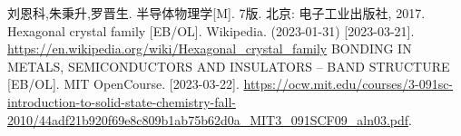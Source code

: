 \begin{thebibliography}{99}%
     刘恩科,朱秉升,罗晋生. 半导体物理学[M]. 7版. 北京: 电子工业出版社, 2017.
     Hexagonal crystal family [EB/OL]. Wikipedia. (2023-01-31) [2023-03-21].\\ \url{https://en.wikipedia.org/wiki/Hexagonal_crystal_family}
     BONDING IN METALS, SEMICONDUCTORS AND
    INSULATORS – BAND STRUCTURE [EB/OL]. MIT OpenCourse. [2023-03-22]. \url{https://ocw.mit.edu/courses/3-091sc-introduction-to-solid-state-chemistry-fall-2010/44adf21b920f69e8c809b1ab75b62d0a_MIT3_091SCF09_aln03.pdf}.
\end{thebibliography}
